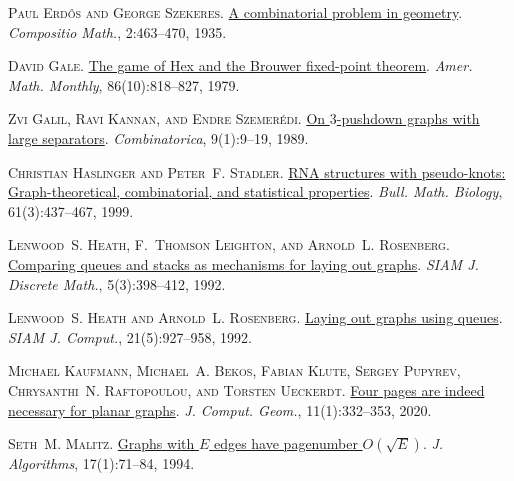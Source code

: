\documentclass[kpfonts]{patmorin}
\begin{document}
	\textsc{Paul Erd\H{o}s and George Szekeres}.
	\newblock \href{http://www.numdam.org/item?id=CM_1935__2__463_0}{A
		combinatorial problem in geometry}.
	\newblock \emph{Compositio Math.}, 2:463--470, 1935.
	
	\textsc{David Gale}.
	\newblock \href{https://doi.org/10.2307/2320146}{The game of {H}ex and the
		{B}rouwer fixed-point theorem}.
	\newblock \emph{Amer. Math. Monthly}, 86(10):818--827, 1979.
	
	\textsc{Zvi Galil, Ravi Kannan, and Endre Szemer\'{e}di}.
	\newblock \href{https://doi.org/10.1007/BF02122679}{On $3$-pushdown graphs with
		large separators}.
	\newblock \emph{Combinatorica}, 9(1):9--19, 1989.
	
	\textsc{Christian Haslinger and Peter~F. Stadler}.
	\newblock \href{https://doi.org/10.1006/bulm.1998.0085}{{RNA} structures with
		pseudo-knots: {G}raph-theoretical, combinatorial, and statistical
		properties}.
	\newblock \emph{Bull. Math. Biology}, 61(3):437--467, 1999.
	
	\textsc{Lenwood~S. Heath, F.~Thomson Leighton, and Arnold~L. Rosenberg}.
	\newblock \href{https://doi.org/10.1137/0405031}{Comparing queues and stacks as
		mechanisms for laying out graphs}.
	\newblock \emph{SIAM J. Discrete Math.}, 5(3):398--412, 1992.
	
	\textsc{Lenwood~S. Heath and Arnold~L. Rosenberg}.
	\newblock \href{https://doi.org/10.1137/0221055}{Laying out graphs using
		queues}.
	\newblock \emph{SIAM J. Comput.}, 21(5):927--958, 1992.
	
	\textsc{Michael Kaufmann, Michael~A. Bekos, Fabian Klute, Sergey Pupyrev,
		Chrysanthi~N. Raftopoulou, and Torsten Ueckerdt}.
	\newblock
	\href{https://journals.carleton.ca/jocg/index.php/jocg/article/view/504}{Four
		pages are indeed necessary for planar graphs}.
	\newblock \emph{J. Comput. Geom.}, 11(1):332--353, 2020.
	
	\textsc{Seth~M. Malitz}.
	\newblock \href{https://doi.org/10.1006/jagm.1994.1027}{Graphs with ${E}$ edges
		have pagenumber ${O}(\sqrt {E})$}.
	\newblock \emph{J. Algorithms}, 17(1):71--84, 1994.
	
\end{document}
